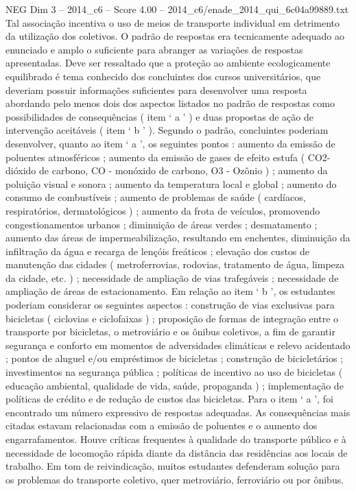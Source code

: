 \begin{textsample}{NEG Dim 3 – 2014\_c6 – Score 4.00 – 2014\_c6/enade\_2014\_qui\_6c04a99889.txt}
Tal associação incentiva o uso de meios de transporte individual em detrimento da utilização dos coletivos.
O padrão de respostas era tecnicamente adequado ao enunciado e amplo o suficiente para abranger as variações de respostas apresentadas.
Deve ser ressaltado que a proteção ao ambiente ecologicamente equilibrado é tema conhecido dos concluintes dos cursos universitários, que deveriam possuir informações suficientes para desenvolver uma resposta abordando pelo menos dois dos aspectos listados no padrão de respostas como possibilidades de consequências ( item ‘ a ’ ) e duas propostas de ação de intervenção aceitáveis ( item ‘ b ’ ).
Segundo o padrão, concluintes poderiam desenvolver, quanto ao item ‘ a ’, os seguintes pontos : aumento da emissão de poluentes atmosféricos ; aumento da emissão de gases de efeito estufa ( CO2- dióxido de carbono, CO - monóxido de carbono, O3 - Ozônio ) ; aumento da poluição visual e sonora ; aumento da temperatura local e global ; aumento do consumo de combustíveis ; aumento de problemas de saúde ( cardíacos, respiratórios, dermatológicos ) ; aumento da frota de veículos, promovendo congestionamentos urbanos ; diminuição de áreas verdes ; desmatamento ; aumento das áreas de impermeabilização, resultando em enchentes, diminuição da infiltração da água e recarga de lençóis freáticos ; elevação dos custos de manutenção das cidades ( metroferrovias, rodovias, tratamento de água, limpeza da cidade, etc. ) ; necessidade de ampliação de vias trafegáveis ; necessidade de ampliação de áreas de estacionamento.
Em relação ao item ‘ b ’, os estudantes poderiam considerar os seguintes aspectos : construção de vias exclusivas para bicicletas ( ciclovias e ciclofaixas ) ; proposição de formas de integração entre o transporte por bicicletas, o metroviário e os ônibus coletivos, a fim de garantir segurança e conforto em momentos de adversidades climáticas e relevo acidentado ; pontos de aluguel e/ou empréstimos de bicicletas ; construção de bicicletários ; investimentos na segurança pública ; políticas de incentivo ao uso de bicicletas ( educação ambiental, qualidade de vida, saúde, propaganda ) ; implementação de políticas de crédito e de redução de custos das bicicletas.
Para o item ‘ a ’, foi encontrado um número expressivo de respostas adequadas.
As consequências mais citadas estavam relacionadas com a emissão de poluentes e o aumento dos engarrafamentos.
Houve críticas frequentes à qualidade do transporte público e à necessidade de locomoção rápida diante da distância das residências aos locais de trabalho.
Em tom de reivindicação, muitos estudantes defenderam solução para os problemas do transporte coletivo, quer metroviário, ferroviário ou por ônibus.

\end{textsample}
